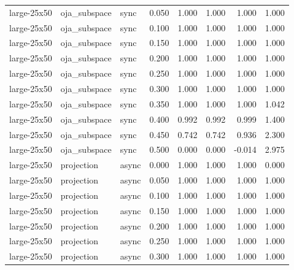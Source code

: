 \begin{tabular}{lllrrrrr}
large-25x50 & oja\_subspace & sync & 0.050 & 1.000 & 1.000 & 1.000 & 1.000 \\

large-25x50 & oja\_subspace & sync & 0.100 & 1.000 & 1.000 & 1.000 & 1.000 \\

large-25x50 & oja\_subspace & sync & 0.150 & 1.000 & 1.000 & 1.000 & 1.000 \\

large-25x50 & oja\_subspace & sync & 0.200 & 1.000 & 1.000 & 1.000 & 1.000 \\

large-25x50 & oja\_subspace & sync & 0.250 & 1.000 & 1.000 & 1.000 & 1.000 \\

large-25x50 & oja\_subspace & sync & 0.300 & 1.000 & 1.000 & 1.000 & 1.000 \\

large-25x50 & oja\_subspace & sync & 0.350 & 1.000 & 1.000 & 1.000 & 1.042 \\

large-25x50 & oja\_subspace & sync & 0.400 & 0.992 & 0.992 & 0.999 & 1.400 \\

large-25x50 & oja\_subspace & sync & 0.450 & 0.742 & 0.742 & 0.936 & 2.300 \\

large-25x50 & oja\_subspace & sync & 0.500 & 0.000 & 0.000 & -0.014 & 2.975 \\

large-25x50 & projection & async & 0.000 & 1.000 & 1.000 & 1.000 & 0.000 \\

large-25x50 & projection & async & 0.050 & 1.000 & 1.000 & 1.000 & 1.000 \\

large-25x50 & projection & async & 0.100 & 1.000 & 1.000 & 1.000 & 1.000 \\

large-25x50 & projection & async & 0.150 & 1.000 & 1.000 & 1.000 & 1.000 \\

large-25x50 & projection & async & 0.200 & 1.000 & 1.000 & 1.000 & 1.000 \\

large-25x50 & projection & async & 0.250 & 1.000 & 1.000 & 1.000 & 1.000 \\

large-25x50 & projection & async & 0.300 & 1.000 & 1.000 & 1.000 & 1.000 \\


\end{tabular}
